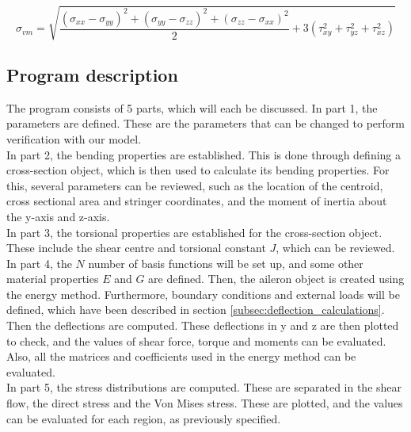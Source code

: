 \begin{equation}\label{eq:vonmises}
\sigma_{vm} = \sqrt{\frac{(\sigma_{xx}-\sigma_{yy})^2+(\sigma_{yy}-\sigma_{zz})^2+(\sigma_{zz}-\sigma_{xx})^2}{2} + 3 (\tau_{xy}^2+\tau_{yz}^2+\tau_{xz}^2)}
\end{equation}

\subsection{Program description}
The program consists of 5 parts, which will each be discussed. 
In part 1, the parameters are defined. These are the parameters that can be changed to perform verification with our model. \\

\noindent In part 2, the bending properties are established. This is done through defining a cross-section object, which is then used to calculate its bending properties. For this, several parameters can be reviewed, such as the location of the centroid, cross sectional area and stringer coordinates, and the moment of inertia about the y-axis and z-axis.\\

\noindent In part 3, the torsional properties are established for the cross-section object. These include the shear centre and torsional constant $J$, which can be reviewed. \\

\noindent In part 4, the $N$ number of basis functions will be set up, and some other material properties $E$ and $G$ are defined. Then, the aileron object is created using the energy method. Furthermore, boundary conditions and external loads will be defined, which have been described in section \ref{subsec:deflection_calculations}. Then the deflections are computed. These deflections in y and z are then plotted to check, and the values of shear force, torque and moments can be evaluated. Also, all the matrices and coefficients used in the energy method can be evaluated.\\

\noindent In part 5, the stress distributions are computed. These are separated in the shear flow, the direct stress and the Von Mises stress. These are plotted, and the values can be evaluated for each region, as previously specified.